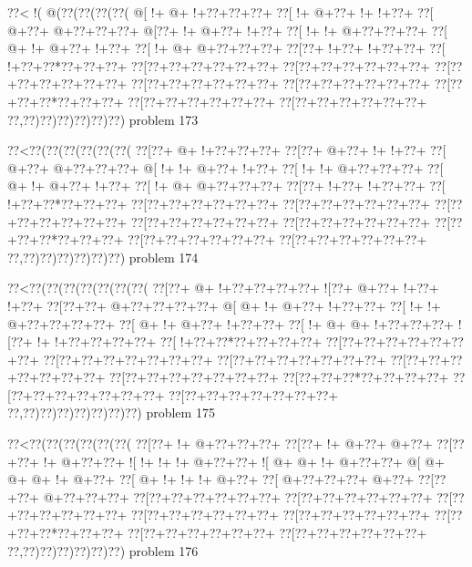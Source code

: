 \vbox{\vbox{\goo
\0??<\- !(\- @(\0??(\0??(\0??(\0??(
\- @[\- !+\- @+\- !+\0??+\0??+\0??+
\0??[\- !+\- @+\0??+\- !+\- !+\0??+
\0??[\- @+\0??+\- @+\0??+\0??+\0??+
\- @[\0??+\- !+\- @+\0??+\- !+\0??+
\0??[\- !+\- !+\- @+\0??+\0??+\0??+
\0??[\- @+\- !+\- @+\0??+\- !+\0??+
\0??[\- !+\- @+\- @+\0??+\0??+\0??+
\0??[\0??+\- !+\0??+\- !+\0??+\0??+
\0??[\- !+\0??+\0??*\0??+\0??+\0??+
\0??[\0??+\0??+\0??+\0??+\0??+\0??+
\0??[\0??+\0??+\0??+\0??+\0??+\0??+
\0??[\0??+\0??+\0??+\0??+\0??+\0??+
\0??[\0??+\0??+\0??+\0??+\0??+\0??+
\0??[\0??+\0??+\0??+\0??+\0??+\0??+
\0??[\0??+\0??+\0??*\0??+\0??+\0??+
\0??[\0??+\0??+\0??+\0??+\0??+\0??+
\0??[\0??+\0??+\0??+\0??+\0??+\0??+
\0??,\0??)\0??)\0??)\0??)\0??)\0??)
}
\hfil problem 173\hfil\break
}

\vbox{\vbox{\goo
\0??<\0??(\0??(\0??(\0??(\0??(\0??(
\0??[\0??+\- @+\- !+\0??+\0??+\0??+
\0??[\0??+\- @+\0??+\- !+\- !+\0??+
\0??[\- @+\0??+\- @+\0??+\0??+\0??+
\- @[\- !+\- !+\- @+\0??+\- !+\0??+
\0??[\- !+\- !+\- @+\0??+\0??+\0??+
\0??[\- @+\- !+\- @+\0??+\- !+\0??+
\0??[\- !+\- @+\- @+\0??+\0??+\0??+
\0??[\0??+\- !+\0??+\- !+\0??+\0??+
\0??[\- !+\0??+\0??*\0??+\0??+\0??+
\0??[\0??+\0??+\0??+\0??+\0??+\0??+
\0??[\0??+\0??+\0??+\0??+\0??+\0??+
\0??[\0??+\0??+\0??+\0??+\0??+\0??+
\0??[\0??+\0??+\0??+\0??+\0??+\0??+
\0??[\0??+\0??+\0??+\0??+\0??+\0??+
\0??[\0??+\0??+\0??*\0??+\0??+\0??+
\0??[\0??+\0??+\0??+\0??+\0??+\0??+
\0??[\0??+\0??+\0??+\0??+\0??+\0??+
\0??,\0??)\0??)\0??)\0??)\0??)\0??)
}
\hfil problem 174\hfil\break
}

\vbox{\vbox{\goo
\0??<\0??(\0??(\0??(\0??(\0??(\0??(\0??(
\0??[\0??+\- @+\- !+\0??+\0??+\0??+\0??+
\- ![\0??+\- @+\0??+\- !+\0??+\- !+\0??+
\0??[\0??+\0??+\- @+\0??+\0??+\0??+\0??+
\- @[\- @+\- !+\- @+\0??+\- !+\0??+\0??+
\0??[\- !+\- !+\- @+\0??+\0??+\0??+\0??+
\0??[\- @+\- !+\- @+\0??+\- !+\0??+\0??+
\0??[\- !+\- @+\- @+\- !+\0??+\0??+\0??+
\- ![\0??+\- !+\- !+\0??+\0??+\0??+\0??+
\0??[\- !+\0??+\0??*\0??+\0??+\0??+\0??+
\0??[\0??+\0??+\0??+\0??+\0??+\0??+\0??+
\0??[\0??+\0??+\0??+\0??+\0??+\0??+\0??+
\0??[\0??+\0??+\0??+\0??+\0??+\0??+\0??+
\0??[\0??+\0??+\0??+\0??+\0??+\0??+\0??+
\0??[\0??+\0??+\0??+\0??+\0??+\0??+\0??+
\0??[\0??+\0??+\0??*\0??+\0??+\0??+\0??+
\0??[\0??+\0??+\0??+\0??+\0??+\0??+\0??+
\0??[\0??+\0??+\0??+\0??+\0??+\0??+\0??+
\0??,\0??)\0??)\0??)\0??)\0??)\0??)\0??)
}
\hfil problem 175\hfil\break
}

\vbox{\vbox{\goo
\0??<\0??(\0??(\0??(\0??(\0??(\0??(
\0??[\0??+\- !+\- @+\0??+\0??+\0??+
\0??[\0??+\- !+\- @+\0??+\- @+\0??+
\0??[\0??+\0??+\- !+\- @+\0??+\0??+
\- ![\- !+\- !+\- !+\- @+\0??+\0??+
\- ![\- @+\- @+\- !+\- @+\0??+\0??+
\- @[\- @+\- @+\- @+\- !+\- @+\0??+
\0??[\- @+\- !+\- !+\- !+\- @+\0??+
\0??[\- @+\0??+\0??+\0??+\- @+\0??+
\0??[\0??+\0??+\- @+\0??+\0??+\0??+
\0??[\0??+\0??+\0??+\0??+\0??+\0??+
\0??[\0??+\0??+\0??+\0??+\0??+\0??+
\0??[\0??+\0??+\0??+\0??+\0??+\0??+
\0??[\0??+\0??+\0??+\0??+\0??+\0??+
\0??[\0??+\0??+\0??+\0??+\0??+\0??+
\0??[\0??+\0??+\0??*\0??+\0??+\0??+
\0??[\0??+\0??+\0??+\0??+\0??+\0??+
\0??[\0??+\0??+\0??+\0??+\0??+\0??+
\0??,\0??)\0??)\0??)\0??)\0??)\0??)
}
\hfil problem 176\hfil\break
}

